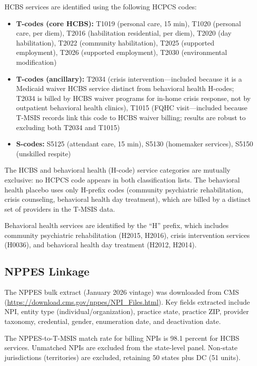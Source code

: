 \documentclass[12pt]{article}
\begin{document}
HCBS services are identified using the following HCPCS codes:

\begin{itemize}
\item \textbf{T-codes (core HCBS):} T1019 (personal care, 15 min), T1020 (personal care, per diem), T2016 (habilitation residential, per diem), T2020 (day habilitation), T2022 (community habilitation), T2025 (supported employment), T2026 (supported employment), T2030 (environmental modification)
\item \textbf{T-codes (ancillary):} T2034 (crisis intervention---included because it is a Medicaid waiver HCBS service distinct from behavioral health H-codes; T2034 is billed by HCBS waiver programs for in-home crisis response, not by outpatient behavioral health clinics), T1015 (FQHC visit---included because T-MSIS records link this code to HCBS waiver billing; results are robust to excluding both T2034 and T1015)
\item \textbf{S-codes:} S5125 (attendant care, 15 min), S5130 (homemaker services), S5150 (unskilled respite)
\end{itemize}

\noindent The HCBS and behavioral health (H-code) service categories are mutually exclusive: no HCPCS code appears in both classification lists. The behavioral health placebo uses only H-prefix codes (community psychiatric rehabilitation, crisis counseling, behavioral health day treatment), which are billed by a distinct set of providers in the T-MSIS data.

Behavioral health services are identified by the ``H'' prefix, which includes community psychiatric rehabilitation (H2015, H2016), crisis intervention services (H0036), and behavioral health day treatment (H2012, H2014).

\subsection{NPPES Linkage}

The NPPES bulk extract (January 2026 vintage) was downloaded from CMS (\url{https://download.cms.gov/nppes/NPI_Files.html}). Key fields extracted include NPI, entity type (individual/organization), practice state, practice ZIP, provider taxonomy, credential, gender, enumeration date, and deactivation date.

The NPPES-to-T-MSIS match rate for billing NPIs is 98.1 percent for HCBS services. Unmatched NPIs are excluded from the state-level panel. Non-state jurisdictions (territories) are excluded, retaining 50 states plus DC (51 units).
\end{document}
